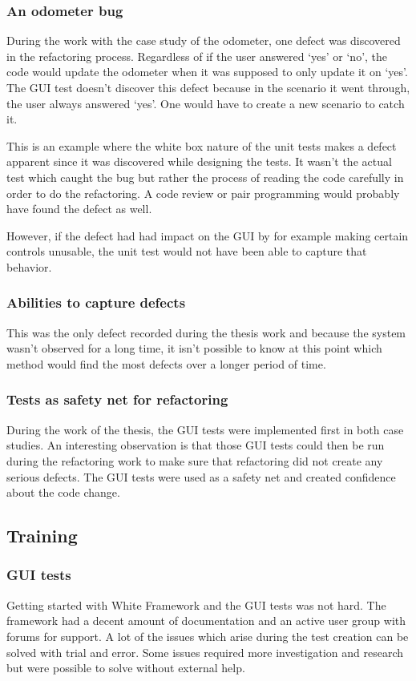 \documentclass{article}
\begin{document}
			\subsubsection{An odometer bug}
			During the work with the case study of the odometer, one defect was discovered in the refactoring process. Regardless of if the user answered `yes' or `no', the code would update the odometer when it was supposed to only update it on `yes'. The GUI test doesn't discover this defect because in the scenario it went through, the user always answered `yes'. One would have to create a new scenario to catch it. 

			This is an example where the white box nature of the unit tests makes a defect apparent since it was discovered while designing the tests. It wasn't the actual test which caught the bug but rather the process of reading the code carefully in order to do the refactoring. A code review or pair programming would probably have found the defect as well. 

			However, if the defect had had impact on the GUI by for example making certain controls unusable, the unit test would not have been able to capture that behavior.

			\subsubsection{Abilities to capture defects}
			This was the only defect recorded during the thesis work and because the system wasn't observed for a long time, it isn't possible to know at this point which method would find the most defects over a longer period of time. 

			\subsubsection{Tests as safety net for refactoring}
			During the work of the thesis, the GUI tests were implemented first in both case studies. An interesting observation is that those GUI tests could then be run during the refactoring work to make sure that refactoring did not create any serious defects. The GUI tests were used as a safety net and created confidence about the code change. 

		\subsection{Training}

			\subsubsection{GUI tests}
			Getting started with White Framework and the GUI tests was not hard. The framework had a decent amount of documentation and an active user group with forums for support. A lot of the issues which arise during the test creation can be solved with trial and error. Some issues required more investigation and research but were possible to solve without external help. 
\end{document}
